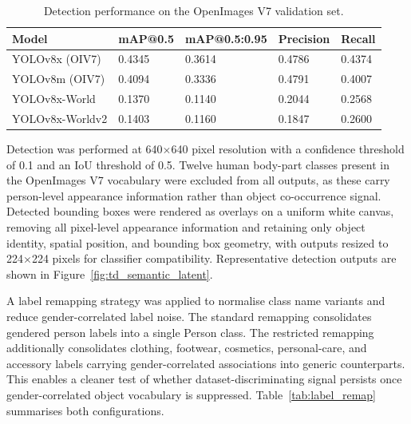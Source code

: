 \begin{table}[ht]
	\centering
	\footnotesize
	\begin{tabular}{lllll}
		\hline
		\textbf{Model}     & \textbf{mAP@0.5} & \textbf{mAP@0.5:0.95} &
		\textbf{Precision} & \textbf{Recall}                                            \\
		\hline
		YOLOv8x (OIV7)     & 0.4345           & 0.3614                & 0.4786 & 0.4374 \\
		YOLOv8m (OIV7)     & 0.4094           & 0.3336                & 0.4791 & 0.4007 \\
		YOLOv8x-World      & 0.1370           & 0.1140                & 0.2044 & 0.2568 \\
		YOLOv8x-Worldv2    & 0.1403           & 0.1160                & 0.1847 & 0.2600 \\
		\hline
	\end{tabular}
	\caption{Detection performance on the OpenImages V7 validation set.}
	\label{tab:objdet_oiv7}
\end{table}

Detection was performed at 640$\times$640 pixel resolution with a confidence threshold of 0.1 and an IoU threshold of 0.5. Twelve human body-part classes present in the OpenImages V7 vocabulary were excluded from all outputs, as these carry person-level appearance information rather than object co-occurrence signal. Detected bounding boxes were rendered as overlays on a uniform white canvas, removing all pixel-level appearance information and retaining only object identity, spatial position, and bounding box geometry, with outputs resized to 224$\times$224 pixels for classifier compatibility. Representative detection outputs are shown in Figure~\ref{fig:td_semantic_latent}.

A label remapping strategy was applied to normalise class name variants and reduce gender-correlated label noise. The standard remapping consolidates gendered person labels into a single Person class. The restricted remapping additionally consolidates clothing, footwear, cosmetics, personal-care, and accessory labels carrying gender-correlated associations into generic counterparts. This enables a cleaner test of whether dataset-discriminating signal persists once gender-correlated object vocabulary is suppressed. Table~\ref{tab:label_remap} summarises both configurations.

